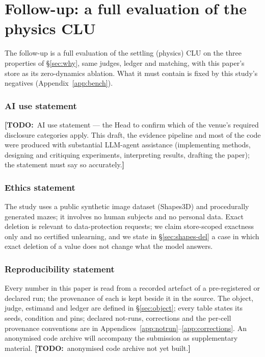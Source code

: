\documentclass{article} %
\newcommand{\TODO}[1]{{\color{orange}\textbf{[TODO:}~#1\textbf{]}}}
\begin{document}
\section{Follow-up: a full evaluation of the physics CLU}
\label{sec:followup}

The follow-up is a full evaluation of the settling (physics) CLU on the three properties of
\S\ref{sec:why}, same judges, ledger and matching, with this paper's store as its zero-dynamics
ablation. What it must contain is fixed by this study's negatives (Appendix~\ref{app:bench}).

\subsubsection*{AI use statement}
\TODO{AI use statement --- the Head to confirm which of the venue's required disclosure categories
apply. This draft, the evidence pipeline and most of the code were produced with substantial LLM-agent
assistance (implementing methods, designing and critiquing experiments, interpreting results,
drafting the paper); the statement must say so accurately.}

\subsubsection*{Ethics statement}
The study uses a public synthetic image dataset (Shapes3D) and procedurally generated mazes; it
involves no human subjects and no personal data. Exact deletion is relevant to data-protection
requests; we claim store-scoped exactness only and no certified unlearning, and we state in
\S\ref{sec:shapes-del} a case in which exact deletion of a value does not change what the model
answers.

\subsubsection*{Reproducibility statement}
Every number in this paper is read from a recorded artefact of a pre-registered or declared run;
the provenance of each is kept beside it in the source. The object, judge, estimand and ledger are
defined in \S\ref{sec:object}; every table states its seeds, condition and pins; declared
not-runs, corrections and the per-cell provenance conventions are in
Appendices~\ref{app:notrun}--\ref{app:corrections}. An anonymised code archive will accompany the
submission as supplementary material. \TODO{anonymised code archive not yet built.}
\end{document}
